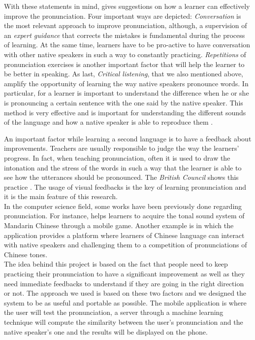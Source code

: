 \noindent With these statements in mind, \cite{gilakjani2011pronunciation} gives suggestions on how a learner can effectively improve the pronunciation. Four important ways are depicted: \textit{Conversation} is the most relevant approach to improve pronunciation, although, a supervision of an \textit{expert guidance} that corrects the mistakes is fundamental during the process of learning. At the same time, learners have to be pro-active to have conversation with other native speakers in such a way to constantly practicing. \textit{Repetitions} of pronunciation exercises is another important factor that will help the learner to be better in speaking. As last, \textit{Critical listening}, that we also mentioned above, amplify the opportunity of learning the way native speakers pronounce words. In particular, for a learner is important to understand the difference when he or she is pronouncing a certain sentence with the one said by the native speaker. This method is very effective and is important for understanding the different sounds of the language and how a native speaker is able to reproduce them \cite{rost2014listening}.

\noindent An important factor while learning a second language is to have a feedback about improvements. Teachers are usually responsible to judge the way the learners' progress. In fact, when teaching pronunciation, often it is used to draw the intonation and the stress of the words in such a way that the learner is able to see how the utterances should be pronounced. The \textit{British Council} shows this practice \cite{bbc_stress}. The usage of visual feedbacks is the key of learning pronunciation and it is the main feature of this research. \\

\noindent In the computer science field, some works have been previously done regarding pronunciation. For instance, \cite{edge2012tip} helps learners to acquire the tonal sound system of Mandarin Chinese through a mobile game. Another example is \cite{head2014tonewars} in which the application provides a platform where learners of Chinese language can interact with native speakers and challenging them to a competition of pronunciations of Chinese tones. \\

\noindent The idea behind this project is based on the fact that people need to keep practicing their pronunciation to have a significant improvement as well as they need immediate feedbacks to understand if they are going in the right direction or not. The approach we used is based on these two factors and we designed the system to be as useful and portable as possible. The mobile application is where the user will test the pronunciation, a server through a machine learning technique will compute the similarity between the user's pronunciation and the native speaker's one and the results will be displayed on the phone. \\

